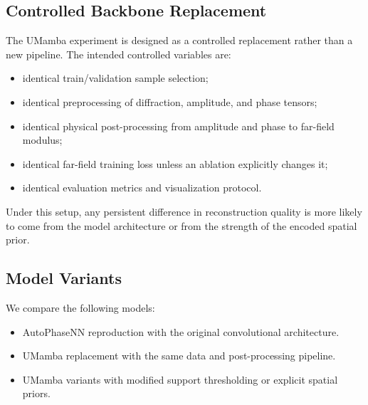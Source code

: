 \subsection{Controlled Backbone Replacement}
The UMamba experiment is designed as a controlled replacement rather than a new
pipeline. The intended controlled variables are:
\begin{itemize}
  \item identical train/validation sample selection;
  \item identical preprocessing of diffraction, amplitude, and phase tensors;
  \item identical physical post-processing from amplitude and phase to far-field
  modulus;
  \item identical far-field training loss unless an ablation explicitly changes
  it;
  \item identical evaluation metrics and visualization protocol.
\end{itemize}
Under this setup, any persistent difference in reconstruction quality is more
likely to come from the model architecture or from the strength of the encoded
spatial prior.

\subsection{Model Variants}
We compare the following models:
\begin{itemize}
  \item AutoPhaseNN reproduction with the original convolutional architecture.
  \item UMamba replacement with the same data and post-processing pipeline.
  \item UMamba variants with modified support thresholding or explicit spatial
  priors.
\end{itemize}
